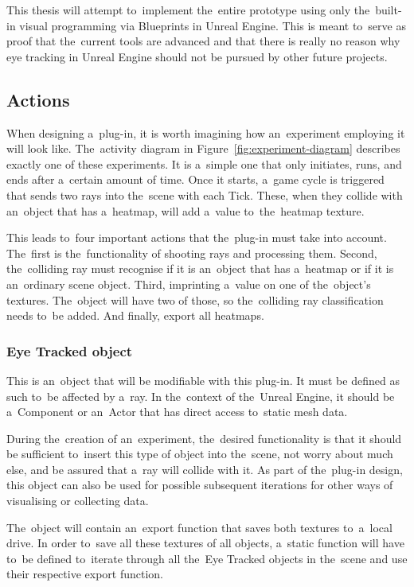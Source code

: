 This thesis will attempt to~implement the~entire prototype using only the~built-in visual programming via Blueprints in Unreal Engine. This is meant to~serve as proof that the~current tools are advanced and that there is really no reason why eye tracking in Unreal Engine should not be pursued by other future projects.

\pagebreak{}

\subsection{Actions}
\label{sec:actions}

When designing a~plug-in, it is worth imagining how an~experiment employing it will look like. The~activity diagram in Figure~\ref{fig:experiment-diagram} describes exactly one of these experiments. It is a~simple one that only initiates, runs, and ends after a~certain amount of time. Once it starts, a~game cycle is triggered that sends two rays into the~scene with each Tick. These, when they collide with an~object that has a~heatmap, will add a~value to~the~heatmap texture.

This leads to~four important actions that the~plug-in must take into account. The~first is the~functionality of shooting rays and processing them. Second, the~colliding ray must recognise if it is an~object that has a~heatmap or if it is an~ordinary scene object. Third, imprinting a~value on one of the~object's textures. The~object will have two of those, so the~colliding ray classification needs to~be added. And finally, export all heatmaps.

\subsubsection*{Eye Tracked object}

This is an~object that will be modifiable with this plug-in. It must be defined as such to~be affected by a~ray. In the~context of the~Unreal Engine, it should be a~Component or an~Actor that has direct access to~static mesh data.

During the~creation of an~experiment, the~desired functionality is that it should be sufficient to~insert this type of object into the~scene, not worry about much else, and be assured that a~ray will collide with it. As part of the~plug-in design, this object can also be used for possible subsequent iterations for other ways of visualising or collecting data.

The~object will contain an~export function that saves both textures to~a~local drive. In order to~save all these textures of all objects, a~static function will have to~be defined to~iterate through all the~Eye Tracked objects in the~scene and use their respective export function.

